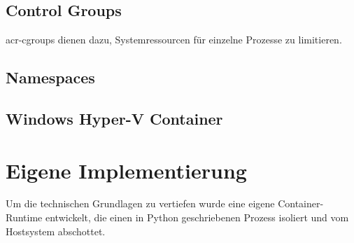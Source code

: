 \subsection{Control Groups}
\label{sec:cgroups}
\glspl{acr-cgroup} dienen dazu, Systemressourcen für einzelne Prozesse zu limitieren. 

\subsection{Namespaces}
\label{sec:namespaces}

\subsection{Windows Hyper-V Container}
\label{sec:}


\section{Eigene Implementierung}
\label{sec:eigeneImpl}

Um die technischen Grundlagen zu vertiefen wurde eine eigene Container-Runtime entwickelt, die einen in Python geschriebenen Prozess isoliert und vom Hostsystem abschottet.